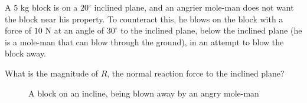 \begin{example}
    A $5$ kg block is on a $20^\circ$ inclined plane, and an angrier mole-man does not want the block near his property. To counteract this, he blows on the block 
    with a force of $10$ N  
    at an angle of $30^\circ$ to the inclined plane, below the inclined plane (he is a mole-man that can blow through the ground), in an attempt to blow the block away.

    What is the magnitude of $R$, the normal reaction force to the inclined plane? 

    \begin{figure}[H]
        \centering
        \caption{A block on an incline, being blown away by an angry mole-man}
        \label{fig:block-on-plane-moleman}
    \end{figure}
\end{example}

